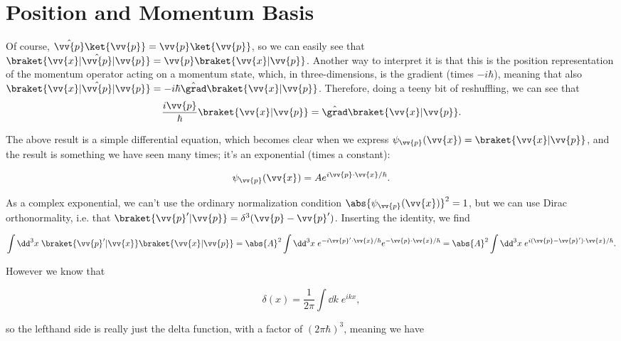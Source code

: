 \section{Position and Momentum Basis}

\begin{parts}
\item Of course, $\hat{\vv{p}}\ket{\vv{p}} = \vv{p}\ket{\vv{p}}$, so we can easily see that $\braket{\vv{x} | \hat{\vv{p}} | \vv{p}} = \vv{p}\braket{\vv{x} | \vv{p}}$. Another way to interpret it is that this is the position representation of the momentum operator acting on a momentum state, which, in three-dimensions, is the gradient (times $-i\hbar$), meaning that also $\braket{\vv{x} | \hat{\vv{p}} | \vv{p}} = -i\hbar \hat{\grad}\braket{\vv{x} | \vv{p}}$. Therefore, doing a teeny bit of reshuffling, we can see that
  \begin{equation}
    \frac{i\vv{p}}{\hbar}\braket{\vv{x} | \vv{p}} = \hat{\grad}\braket{\vv{x} | \vv{p}}.
  \end{equation}


\item The above result is a simple differential equation, which becomes clear when we express $\psi_{\vv{p}}(\vv{x}) = \braket{\vv{x} | \vv{p}}$, and the result is something we have seen many times; it's an exponential (times a constant):

  \begin{equation}
    \psi_{\vv{p}}(\vv{x}) = Ae^{i\vv{p}\cdot\vv{x}/\hbar}.
  \end{equation}

  As a complex exponential, we can't use the ordinary normalization condition $\abs{\psi_{\vv{p}}(\vv{x})}^2 = 1$, but we can use Dirac orthonormality, i.e. that $\braket{\vv{p}' | \vv{p}} = \delta^3(\vv{p} - \vv{p}')$. Inserting the identity, we find

  \begin{equation}
    \int \dd^3x \; \braket{\vv{p}' | \vv{x}} \braket{\vv{x} | \vv{p}} = \abs{A}^2\int \dd^3x \; e^{-i\vv{p}'\cdot\vv{x}/\hbar}e^{-\vv{p}\cdot\vv{x}/\hbar} = \abs{A}^2\int \dd^3x \; e^{i(\vv{p} - \vv{p}')\cdot\vv{x}/\hbar}.
  \end{equation}

  However we know that

  \begin{equation}
    \delta(x) = \frac{1}{2\pi} \int \dd k \; e^{ikx},
  \end{equation}

  so the lefthand side is really just the delta function, with a factor of $(2\pi\hbar)^3$, meaning we have


\end{parts}
